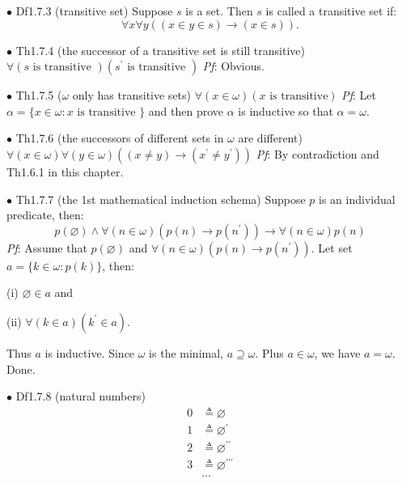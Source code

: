 \documentclass{article}
\begin{document}
\begin{Df}{$\bullet$ Df1.7.3 (transitive set)}
    Suppose $s$ is a set. Then $s$ is called a transitive set if: $$\forall x\forall y \left((x\in y\in s)\rightarrow (x\in s)\right).$$
\end{Df}

\begin{Th}{$\bullet$ Th1.7.4 (the successor of a transitive set is still transitive)}
    \textcolor{Th}{$\forall (s \text{ is transitive }) \left(s^\prime \text{ is transitive }\right)$}
    \tcblower
    \textit{Pf}: Obvious.
\end{Th}

\begin{Th}{$\bullet$ Th1.7.5 ($\omega$ only has transitive sets)}
    \textcolor{Th}{$\forall (x\in \omega) (x \text{ is transitive})$}
    \tcblower
    \textit{Pf}: Let $\alpha = \{x\in \omega: x \text{ is transitive }\}$ and then prove $\alpha$ is inductive so that $\alpha = \omega$.
\end{Th}

\begin{Th}{$\bullet$ Th1.7.6 (the successors of different sets in $\omega$ are different)}
    \textcolor{Th}{$\forall (x\in \omega) \forall (y\in \omega) \left((x\neq y)\rightarrow (x^\prime \neq y^\prime)\right)$}
    \tcblower
    \textit{Pf}: By contradiction and Th1.6.1 in this chapter.
\end{Th}

\begin{Th}{$\bullet$ Th1.7.7 (the 1st mathematical induction schema)}
    \textcolor{Th}{Suppose $p$ is an individual predicate, then:
    $$p(\varnothing)\land \forall (n\in \omega) (p(n)\rightarrow p(n^\prime))\rightarrow \forall (n\in \omega)p(n)$$}
    \tcblower
    \textit{Pf}: Assume that $p(\varnothing)$ and $\forall (n\in \omega)(p(n)\rightarrow p(n^\prime))$. Let set $a = \{k\in \omega: p(k)\}$, then:
    \begin{compactenum}
        \item[(i)] $\varnothing\in a$ and
        \item[(ii)] $\forall (k\in a) (k^\prime\in a)$.
    \end{compactenum}
    Thus $a$ is inductive. Since $\omega$ is the minimal, $a\supseteq \omega$. Plus $a\in \omega$, we have $a=\omega$. Done.
\end{Th}

\begin{Df}{$\bullet$ Df1.7.8 (natural numbers)}
    \begin{align*}
        0 &\triangleq \varnothing\\
        1 &\triangleq \varnothing^\prime\\
        2 &\triangleq \varnothing^{\prime\prime}\\
        3 &\triangleq \varnothing^{\prime\prime\prime}\\
        &\dots
    \end{align*}
\end{Df}
\end{document}

